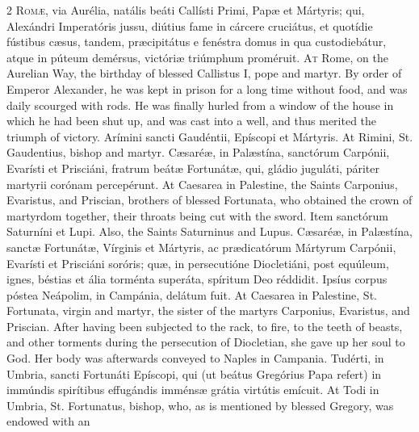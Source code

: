 \begin{paracol}{2}
\lettrine[lines=2]{R}{omæ,} via Aurélia, natális beáti Callísti Primi, Papæ et Mártyris; qui, Alexándri Imperatóris 
 jussu, diútius fame in cárcere cruciátus, et quotídie fústibus cæsus, 
 tandem, præcipitátus e fenéstra domus in qua custodiebátur, atque in púteum 
 demérsus, victóriæ triúmphum proméruit.
\switchcolumn
{}
\lettrine[lines=2]{A}{t} Rome, on the Aurelian Way, the 
 birthday of blessed Callistus I, pope and martyr. By order of Emperor 
 Alexander, he was kept in prison for a long time without food, and was daily 
 scourged with rods. He was finally hurled from a window of the house 
 in which he had been shut up, and was cast into a well, and thus merited the 
 triumph of victory.
\switchcolumn*
{}
Arímini sancti 
 Gaudéntii, Epíscopi et Mártyris.
\switchcolumn
{}
At Rimini, St. Gaudentius, bishop 
 and martyr.
\switchcolumn*
{}
Cæsaréæ, in Palæstína, 
 sanctórum Carpónii, Evarísti et Prisciáni, fratrum beátæ Fortunátæ, qui, 
 gládio juguláti, páriter martyrii corónam percepérunt.
\switchcolumn
{}
At Caesarea in Palestine, the Saints 
 Carponius, Evaristus, and Priscian, brothers of blessed Fortunata, who 
 obtained the crown of martyrdom together, their throats being cut with the 
 sword.
\switchcolumn*
{}
Item sanctórum 
 Saturníni et Lupi.
\switchcolumn
{}
Also, the Saints Saturninus and 
 Lupus.
\switchcolumn*
{}
Cæsaréæ, in Palæstína, 
 sanctæ Fortunátæ, Vírginis et Mártyris, ac prædicatórum Mártyrum Carpónii, 
 Evarísti et Prisciáni soróris; quæ, in persecutióne Diocletiáni, post 
 equúleum, ignes, béstias et ália torménta superáta, spíritum Deo réddidit. 
 Ipsíus corpus póstea Neápolim, in Campánia, delátum fuit.
\switchcolumn
{}
At Caesarea in Palestine, St. 
 Fortunata, virgin and martyr, the sister of the martyrs Carponius, Evaristus, 
 and Priscian. After having been subjected to the rack, to fire, to the 
 teeth of beasts, and other torments during the persecution of Diocletian, she 
 gave up her soul to God. Her body was afterwards conveyed to Naples in 
 Campania.
\switchcolumn*
{}
Tudérti, in Umbria, 
 sancti Fortunáti Epíscopi, qui (ut beátus Gregórius Papa refert) in immúndis 
 spirítibus effugándis imménsæ grátia virtútis emícuit.
\switchcolumn
{}
At Todi in Umbria, St. Fortunatus, 
 bishop, who, as is mentioned by blessed Gregory, was endowed with an 

\end{paracol}
